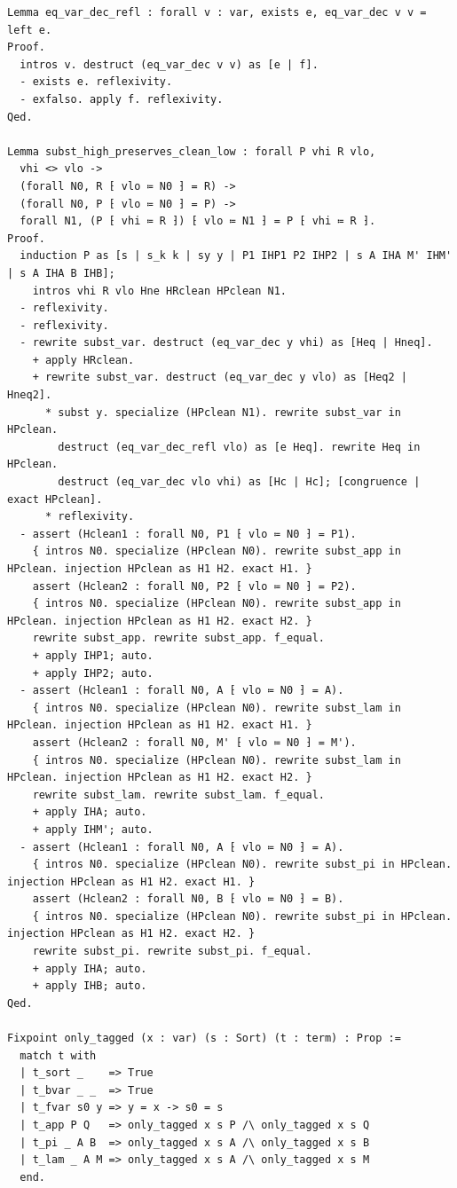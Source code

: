 \begin{latin}
\begin{verbatim}
Lemma eq_var_dec_refl : forall v : var, exists e, eq_var_dec v v = left e.
Proof.
  intros v. destruct (eq_var_dec v v) as [e | f].
  - exists e. reflexivity.
  - exfalso. apply f. reflexivity.
Qed.

Lemma subst_high_preserves_clean_low : forall P vhi R vlo,
  vhi <> vlo ->
  (forall N0, R ⁅ vlo ≔ N0 ⁆ = R) ->
  (forall N0, P ⁅ vlo ≔ N0 ⁆ = P) ->
  forall N1, (P ⁅ vhi ≔ R ⁆) ⁅ vlo ≔ N1 ⁆ = P ⁅ vhi ≔ R ⁆.
Proof.
  induction P as [s | s_k k | sy y | P1 IHP1 P2 IHP2 | s A IHA M' IHM' | s A IHA B IHB];
    intros vhi R vlo Hne HRclean HPclean N1.
  - reflexivity.
  - reflexivity.
  - rewrite subst_var. destruct (eq_var_dec y vhi) as [Heq | Hneq].
    + apply HRclean.
    + rewrite subst_var. destruct (eq_var_dec y vlo) as [Heq2 | Hneq2].
      * subst y. specialize (HPclean N1). rewrite subst_var in HPclean.
        destruct (eq_var_dec_refl vlo) as [e Heq]. rewrite Heq in HPclean.
        destruct (eq_var_dec vlo vhi) as [Hc | Hc]; [congruence | exact HPclean].
      * reflexivity.
  - assert (Hclean1 : forall N0, P1 ⁅ vlo ≔ N0 ⁆ = P1).
    { intros N0. specialize (HPclean N0). rewrite subst_app in HPclean. injection HPclean as H1 H2. exact H1. }
    assert (Hclean2 : forall N0, P2 ⁅ vlo ≔ N0 ⁆ = P2).
    { intros N0. specialize (HPclean N0). rewrite subst_app in HPclean. injection HPclean as H1 H2. exact H2. }
    rewrite subst_app. rewrite subst_app. f_equal.
    + apply IHP1; auto.
    + apply IHP2; auto.
  - assert (Hclean1 : forall N0, A ⁅ vlo ≔ N0 ⁆ = A).
    { intros N0. specialize (HPclean N0). rewrite subst_lam in HPclean. injection HPclean as H1 H2. exact H1. }
    assert (Hclean2 : forall N0, M' ⁅ vlo ≔ N0 ⁆ = M').
    { intros N0. specialize (HPclean N0). rewrite subst_lam in HPclean. injection HPclean as H1 H2. exact H2. }
    rewrite subst_lam. rewrite subst_lam. f_equal.
    + apply IHA; auto.
    + apply IHM'; auto.
  - assert (Hclean1 : forall N0, A ⁅ vlo ≔ N0 ⁆ = A).
    { intros N0. specialize (HPclean N0). rewrite subst_pi in HPclean. injection HPclean as H1 H2. exact H1. }
    assert (Hclean2 : forall N0, B ⁅ vlo ≔ N0 ⁆ = B).
    { intros N0. specialize (HPclean N0). rewrite subst_pi in HPclean. injection HPclean as H1 H2. exact H2. }
    rewrite subst_pi. rewrite subst_pi. f_equal.
    + apply IHA; auto.
    + apply IHB; auto.
Qed.

Fixpoint only_tagged (x : var) (s : Sort) (t : term) : Prop :=
  match t with
  | t_sort _    => True
  | t_bvar _ _  => True
  | t_fvar s0 y => y = x -> s0 = s
  | t_app P Q   => only_tagged x s P /\ only_tagged x s Q
  | t_pi _ A B  => only_tagged x s A /\ only_tagged x s B
  | t_lam _ A M => only_tagged x s A /\ only_tagged x s M
  end.


\end{verbatim}
\end{latin}
